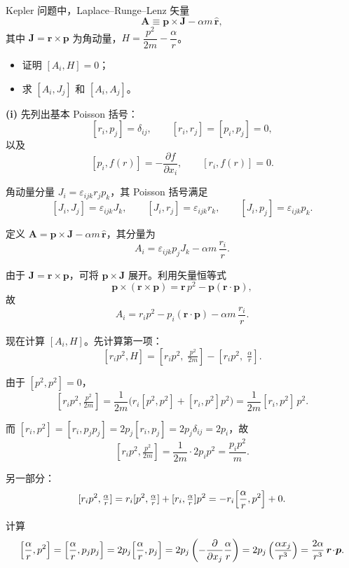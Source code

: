 \begin{question}
Kepler 问题中，Laplace--Runge--Lenz 矢量
\[
\boldsymbol A \equiv \boldsymbol p \times \boldsymbol J - \alpha m\,\hat{\boldsymbol r},
\]
其中 \(\boldsymbol J = \boldsymbol r \times \boldsymbol p\) 为角动量，\(H = \dfrac{p^2}{2m} - \dfrac{\alpha}{r}\)。
\begin{itemize}
  \item[\textup{(i)}] 证明 \([A_i,H]=0\)；
  \item[\textup{(ii)}] 求 \([A_i,J_j]\) 和 \([A_i,A_j]\)。
\end{itemize}
\begin{solution}
\textbf{(i)} 先列出基本 Poisson 括号：
\[
[r_i,p_j] = \delta_{ij},\qquad
[r_i,r_j]=[p_i,p_j]=0,
\]
以及
\[
[p_i,f(r)] = -\frac{\partial f}{\partial x_i},\qquad
[r_i,f(r)] = 0.
\]

角动量分量 \(J_i = \varepsilon_{ijk}r_jp_k\)，其 Poisson 括号满足
\[
[J_i,J_j] = \varepsilon_{ijk}J_k,\qquad
[J_i,r_j] = \varepsilon_{ijk}r_k,\qquad
[J_i,p_j] = \varepsilon_{ijk}p_k.
\]

定义 \(\boldsymbol A = \boldsymbol p \times \boldsymbol J - \alpha m\,\hat{\boldsymbol r}\)，其分量为
\[
A_i = \varepsilon_{ijk}p_jJ_k - \alpha m\,\frac{r_i}{r}.
\]

由于 \(\boldsymbol J = \boldsymbol r \times \boldsymbol p\)，可将 \(\boldsymbol p\times\boldsymbol J\) 展开。利用矢量恒等式
\[
\boldsymbol p \times (\boldsymbol r \times \boldsymbol p)
= \boldsymbol r\,p^2 - \boldsymbol p(\boldsymbol r\!\cdot\!\boldsymbol p),
\]
故
\[
A_i = r_i p^2 - p_i(\boldsymbol r\!\cdot\!\boldsymbol p) - \alpha m\,\frac{r_i}{r}.
\]

现在计算 \([A_i,H]\)。先计算第一项：
\[
[r_i p^2, H] = [r_i p^2,\; \tfrac{p^2}{2m}] - [r_i p^2,\; \tfrac{\alpha}{r}].
\]

由于 \([p^2, p^2]=0\)，
\[
[r_i p^2, \tfrac{p^2}{2m}] = \frac{1}{2m}\bigl(r_i[p^2,p^2] + [r_i,p^2]p^2\bigr)
= \frac{1}{2m}[r_i,p^2]\,p^2.
\]

而 \([r_i,p^2] = [r_i,p_jp_j] = 2p_j[r_i,p_j] = 2p_j\delta_{ij} = 2p_i\)，故
\[
[r_i p^2, \tfrac{p^2}{2m}] = \frac{1}{2m}\cdot 2p_i p^2 = \frac{p_i p^2}{m}.
\]

另一部分：
\[
[r_i p^2, \tfrac{\alpha}{r}] = r_i[p^2,\tfrac{\alpha}{r}] + [r_i,\tfrac{\alpha}{r}]p^2
= -r_i\Bigl[\frac{\alpha}{r},p^2\Bigr] + 0.
\]

计算
\[
\Bigl[\frac{\alpha}{r}, p^2\Bigr]
= \Bigl[\frac{\alpha}{r}, p_jp_j\Bigr]
= 2p_j\Bigl[\frac{\alpha}{r}, p_j\Bigr]
= 2p_j\left(-\frac{\partial}{\partial x_j}\frac{\alpha}{r}\right)
= 2p_j\left(\frac{\alpha x_j}{r^3}\right)
= \frac{2\alpha}{r^3}\,\boldsymbol r\!\cdot\!\boldsymbol p.
\]


\end{solution}
\end{question}
